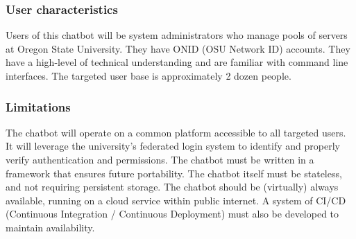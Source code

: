 \documentclass[onecolumn, draftclsnofoot,10pt, compsoc]{IEEEtran}
\begin{document}
\subsubsection{User characteristics}
Users of this chatbot will be system administrators who manage pools of servers at Oregon State University. They have ONID (OSU Network ID) accounts. They have a high-level of technical understanding and are familiar with command line interfaces. The targeted user base is approximately 2 dozen people.
\subsubsection{Limitations}
The chatbot will operate on a common platform accessible to all targeted users.
It will leverage the university's federated login system to identify and properly verify authentication and permissions.
The chatbot must be written in a framework that ensures future portability.
The chatbot itself must be stateless, and not requiring persistent storage.
The chatbot should be (virtually) always available, running on a cloud service within public internet.
A system of CI/CD (Continuous Integration / Continuous Deployment) must also be developed to maintain availability.
\end{document}
